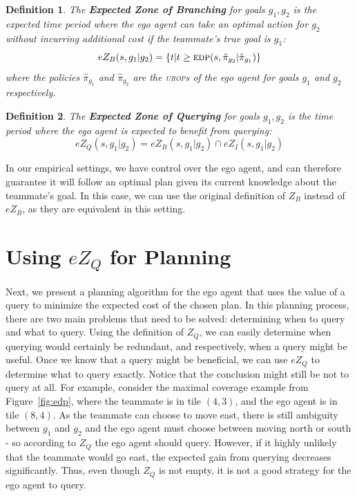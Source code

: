 \documentclass[letterpaper]{article}
\newtheorem{definition}{Definition}
\begin{document}
\begin{definition}
The \textbf{Expected Zone of Branching} for goals $g_1, g_2$ is the expected time period where the ego agent can take an optimal action for $g_2$ without incurring additional cost if the teammate's true goal is $g_1$:
\begin{equation*}
    eZ_B(s, g_1 | g_2) = \{t | t \geq \textsc{edp}(s, \hat{\pi}_{g_2} | \hat{\pi}_{g_1})\}
\end{equation*}
where the policies $\hat{\pi}_{g_1}$ and $\hat{\pi}_{g_2}$ are the \textsc{urop}s of the \emph{ego agent} for goals $g_1$ and $g_2$ respectively.%
\end{definition}

\begin{definition}
The \textbf{Expected Zone of Querying}  for goals $g_1, g_2$ is the time period where the ego agent is expected to benefit from querying:
\begin{equation*}
    eZ_Q(s, g_1 | g_2) = eZ_B(s, g_1 | g_2) \cap eZ_I(s, g_1 | g_2)
\end{equation*}
\end{definition}
In our empirical settings, we have control over the ego agent, and can therefore guarantee it will follow an optimal plan given its current knowledge about the teammate's goal. In this case, we can use the original definition of $Z_B$ instead of $eZ_B$, as they are equivalent in this setting.

\section{Using $eZ_Q$ for Planning}
\label{sec:alg}
Next, we present a planning algorithm for the ego agent that uses the value of a query to minimize the expected cost of the chosen plan. In this planning process, there are two main problems that need to be solved: determining when to query and what to query. Using the definition of $Z_Q$, we can easily determine when querying would certainly be redundant, and respectively, when a query might be useful. Once we know that a query might be beneficial, we can use $eZ_Q$ to determine what to query exactly. Notice that the conclusion might still be not to query at all. For example, consider the maximal coverage example from Figure~\ref{fig:edp}, where the teammate is in tile $(4,3)$, and the ego agent is in tile $(8,4)$. As the teammate can choose to move east, there is still ambiguity between $g_1$ and $g_2$ and the ego agent must choose between moving north or south - so according to $Z_Q$ the ego agent should query. However, if it highly unlikely that the teammate would go east, the expected gain from querying decreases significantly. Thus, even though $Z_Q$ is not empty, it is not a good strategy for the ego agent to query. %
\end{document}
